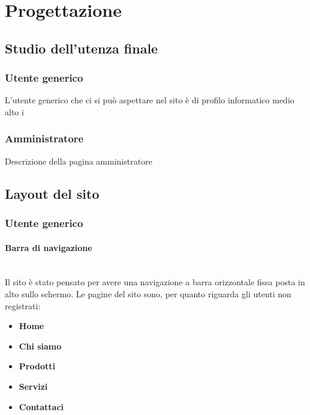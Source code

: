 \newpage
\section{Progettazione}
\subsection{Studio dell'utenza finale}
\subsubsection{Utente generico}
L'utente generico che ci si può aspettare nel sito è di profilo informatico medio alto i


\subsubsection{Amministratore}
Descrizione della pagina amministratore 

\subsection{Layout del sito}

\subsubsection{Utente generico}

\paragraph{Barra di navigazione}
~\\Il sito è stato pensato per avere una navigazione a barra orizzontale fissa posta in alto sullo schermo. Le pagine del sito sono, per quanto riguarda gli utenti non registrati:
\begin{itemize}
	\item \textbf{Home}
	\item \textbf{Chi siamo}
	\item \textbf{Prodotti}
	\item \textbf{Servizi}
	\item \textbf{Contattaci}
\end{itemize}

